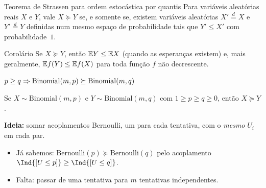 \documentclass[aspectratio=169]{beamer}
\begin{document}
\begin{frame}

  \vfill
  \begin{block}{{Teorema} de Strassen para ordem estocástica por quantis}
    Para variáveis aleatórias reais $X$ e $Y$, vale $X\succeq Y$ se, e
    somente se, existem variáveis aleatórias $X'\stackrel{d}{=} X$ e
    $Y'\stackrel{d}{=}Y$ definidas num mesmo espaço de probabilidade
    tais que $Y'\leq X'$ com probabilidade~$1$.
  \end{block}
  \vfill
  \begin{block}{Corolário}
    Se $X\succeq Y$, então $\mathbb{E}{Y}\leq\mathbb{E}{X}$ (quando as esperanças
    existem) e, mais geralmente, $\mathbb{E}{f(Y)}\leq\mathbb{E}{f(X)}$ para toda
    função $f$ não decrescente. 
  \end{block}
  \vfill
  
\end{frame}
\begin{frame}{$p\geq q \Rightarrow \mathrm{Binomial}(m,p) \succeq \mathrm{Binomial}(m,q)$}

    Se $X\sim\mathrm{Binomial}(m,p)$ e $Y\sim\mathrm{Binomial}(m,q)$
    com $1\geq p\geq q\geq 0$, então $X\succeq Y$.


  \vfill

  \textbf{Ideia:} somar acoplamentos Bernoulli, um para cada tentativa,
  com o \emph{mesmo} $U_i$ em cada par.

  \vfill

  \begin{itemize}
  \item Já sabemos: $\mathrm{Bernoulli}(p)\succeq\mathrm{Bernoulli}(q)$
    pelo acoplamento $\Ind{\colch{U\leq p}}\geq\Ind{\colch{U\leq q}}$.
  \item Falta: passar de uma tentativa para $m$ tentativas
    independentes.
  \end{itemize}

\end{frame}
\end{document}
